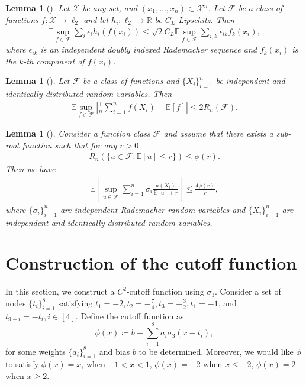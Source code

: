 \documentclass{article}
\newcommand{\R}{\mathbb{R}}
\newcommand{\E}{\mathbb{E}}
\newcommand{\F}{\mathcal{F}}
\theoremstyle{plain}
\newtheorem{lemma}[theorem]{Lemma}
\theoremstyle{definition}
\theoremstyle{remark}
\begin{document}
\begin{lemma}[{\citep[Corollary 4]{maurer2016vector}}] \label{ledoux_talagrand}
    Let $\mathcal{X}$ be any set, and $(x_1, \ldots, x_n) \subset \mathcal{X}^n$. Let $\mathcal{F}$ be a class of functions $f: \mathcal{X} \to \ell_2$ and let $h_i: \ell_2 \to \R$ be $C_L$-Lipschitz. Then 
    \begin{align*}
        \E \sup_{f \in \mathcal{F}} \sum_{i} \epsilon_i h_i(f(x_i)) \leq \sqrt{2} C_L \E \sup_{f \in \mathcal{F}} \sum_{i, k} \epsilon_{ik} f_k(x_i),
    \end{align*}
    where $\epsilon_{ik}$ is an independent doubly indexed Rademacher sequence and $f_k(x_i)$ is the $k$-th component of $f(x_i)$.
\end{lemma}

\begin{lemma}[{\citep[Lemma 6.3.2]{vershynin2018high}}] \label{symmetrization}
    Let $\F$ be a class of functions and $\{X_i\}_{i=1}^n$ be independent and identically distributed random variables.
    Then
    \begin{align*}
        \E \sup_{f \in \F }\left| \frac{1}{n} \sum_{i=1}^n f(X_i) - \E[f]\right| \leq 2R_n(\F). 
    \end{align*}
\end{lemma}

\begin{lemma}[{\citep[Lemma A.7]{lu2021machine}}] \label{peeling_lemma}
    Consider a function class $\F$ and assume that there exists a sub-root function such that for any $r > 0$
    \begin{align*}
        R_n(\{u \in \F: \E[u] \leq r\}) \leq \phi(r).
    \end{align*}
    Then we have 
    \begin{align*}
        \E \left[\sup_{u \in \F} \sum_{i=1}^n \sigma_i \frac{u(X_i)}{\E[u] + r }\right] \leq \frac{4 \phi(r)}{r},
    \end{align*}
    where $\{\sigma_i\}_{i=1}^n$ are independent Rademacher random variables and $\{X_i\}_{i=1}^n$ are independent and identically distributed random variables. 
\end{lemma}

\section{Construction of the cutoff function} \label{construction_cutoff}
In this section, we construct a $C^2$-cutoff function using $\sigma_3$. Consider a set of nodes $\{t_i\}_{i=1}^8$ satisfying $t_1 = -2, t_2 = -\frac{7}{4}, t_3 = -\frac{3}{2}, t_1 = -1$, and $t_{9-i} = -t_{i}, i \in [4]$. Define the cutoff function as
\begin{equation*}
    \phi(x) \coloneqq b + \sum_{i=1}^8 a_i \sigma_3(x - t_i),
\end{equation*}
for some weights $\{a_i\}_{i=1}^8$ and bias $b$ to be determined. Moreover, we would like $\phi$ to satisfy $\phi(x) = x$, when $-1 < x < 1$, $\phi(x) = -2$ when $x \leq -2$, $\phi(x) = 2$ when $x \geq 2$. 
\end{document}
